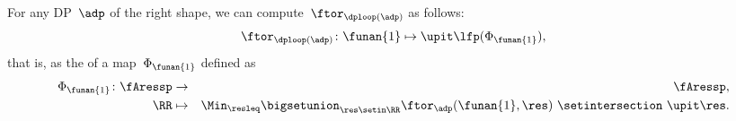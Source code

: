 \begin{theorem}
    \label{prop:loop-continuous}
    For any DP~$\adp$ of the right shape, we can compute~$\ftor_{\dploop(\adp)}$ as follows:
    \begin{equation}
        \label{eq:loop_fixpoint1}
        \ftor_{\dploop(\adp)}\colon\funan{1}\mapsto\upit\lfp(\Phi_{\funan{1}}),
    \end{equation}
    that is, as the \emph{} of a map~$\Phi_{\funan{1}}$ defined as
    \begin{eqnarray}
        \Phi_{\funan{1}}\colon\fAressp & \to     & \fAressp,\label{eq:bigphi1} \\
        \RR                            & \mapsto & \Min_{\resleq}\bigsetunion_{\res\setin\RR}\ftor_{\adp}(\funan{1}, \res)\ \setintersection\ \upit\res.
        \nonumber
    \end{eqnarray}
\end{theorem}
